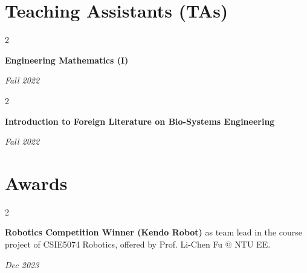 \documentclass[10pt, letterpaper]{article}
\newenvironment{twocolentry}[2][4.5 cm]{
    \needspace{4\baselineskip}%
    \onecolentry
    \def\secondColumn{#2}
    \setcolumnwidth{\fill, #1}
    \begin{paracol}{2}
}{
    \switchcolumn \raggedleft \secondColumn
    \end{paracol}
    \endonecolentry
} %
\begin{document}
    \section{Teaching Assistants (TAs)}
    
        \begin{twocolentry}{
        \textit{Fall 2022}}
            \textbf{Engineering Mathematics (I)}
        \end{twocolentry}

        \vspace{0.2 cm}

        \begin{twocolentry}{
        \textit{Fall 2022}}
            \textbf{Introduction to Foreign Literature on Bio-Systems Engineering}
        \end{twocolentry}
        
    \section{Awards}
    
        \begin{twocolentry}{
        \textit{Dec 2023}}
            \textbf{Robotics Competition Winner (Kendo Robot)} as team lead in the course project of CSIE5074 Robotics, offered by Prof. Li-Chen Fu @ NTU EE.
        \end{twocolentry}
\end{document}
